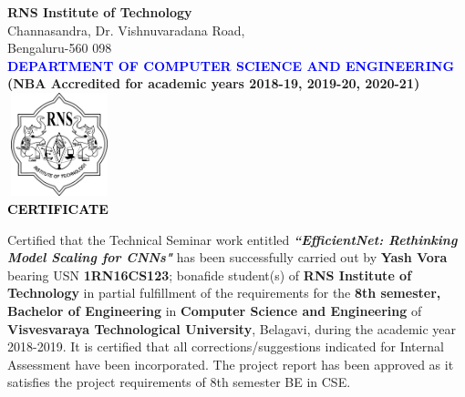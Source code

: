 \thispagestyle{empty}
\begin{center}

\textup{\large {\textcolor{darkbrown}{\bf RNS Institute of Technology}} \\ 
\normalsize{\textcolor{darkbrown}{Channasandra, Dr. Vishnuvaradana Road,\\ Bengaluru-560 098}}}\\[0.1in]
\textup{\normalsize {\textcolor{blue}{\bf DEPARTMENT OF COMPUTER SCIENCE AND ENGINEERING}}}\\ \textup{\small \bf \textcolor{darkbrown}{(NBA Accredited for academic years 2018-19, 2019-20, 2020-21)}} \\[0.1in]
\includegraphics[width=3cm, height=3cm]{../static/media/RNS_logo.png}\\[0.1in]
\textup{\large {\textcolor{black}{\textbf {CERTIFICATE}}}} \\[0.1in]
\end{center}

\begin{minipage}{14.8cm}
Certified that the Technical Seminar work entitled \textit{\textbf{``EfficientNet: Rethinking Model Scaling for CNNs"}} has been successfully carried out by \textbf{Yash Vora} bearing USN \textbf{1RN16CS123};   bonafide student(s) of \textbf{RNS Institute of Technology} in partial fulfillment of the requirements for the \textbf{8th semester, Bachelor of Engineering} in \textbf{Computer Science and Engineering} of \textbf{Visvesvaraya Technological University}, Belagavi, during the academic year 2018-2019. It is certified that all corrections/suggestions indicated for Internal Assessment have been incorporated. The project report has been approved as it satisfies the project requirements of 8th semester BE in CSE.\\[0.4in]
\end{minipage}

